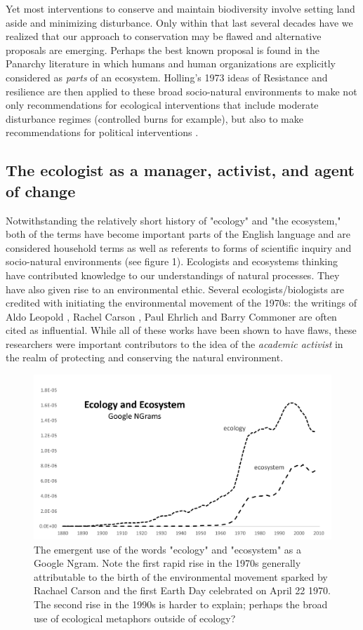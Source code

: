 Yet most interventions to conserve and maintain biodiversity involve setting land aside and minimizing disturbance. Only within that last several decades have we realized that our approach to conservation may be flawed and alternative proposals are emerging. Perhaps the best known proposal is found in the Panarchy literature in which humans and human organizations are explicitly considered as \textit{parts} of an ecosystem. Holling's 1973 ideas of Resistance and resilience are then applied to these broad socio-natural environments to make not only recommendations for ecological interventions that include moderate disturbance regimes (controlled burns for example), but also to make recommendations for political interventions \citep{holling_2002}.

\subsection{The ecologist as a manager, activist, and agent of change}

 Notwithstanding the relatively short history of "ecology" and "the ecosystem," both of the terms have become important parts of the English language and are considered household terms as well as referents to forms of scientific inquiry and socio-natural environments (see figure 1). Ecologists and ecosystems thinking have contributed knowledge to our understandings of natural processes. They have also given rise to an environmental ethic. Several ecologists/biologists are credited with initiating the environmental movement of the 1970s: the writings of Aldo Leopold \citep{leopold_1949}, Rachel Carson \citep{carson_1962}, Paul Ehrlich \citep{ehrlich_1968} and Barry Commoner \citep{commoner_1971} are often cited as influential. While all of these works have been shown to have flaws, these researchers were important contributors to the idea of the \textit{academic activist} in the realm of protecting and conserving the natural environment. 
 
 \begin{figure}[!ht]
  \centering
    \includegraphics[width=5.5in]{figures/ecologyEcosystem}
  \caption{The emergent use of the words "ecology" and "ecosystem" as a Google Ngram. Note the first rapid rise in the 1970s generally attributable to the birth of the environmental movement sparked by Rachael Carson and the first Earth Day celebrated on April 22 1970. The second rise in the 1990s is harder to explain; perhaps the broad use of ecological metaphors outside of ecology?}
\end{figure}
 
